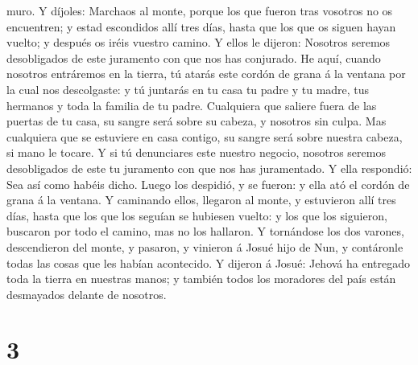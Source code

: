 muro.  Y díjoles: Marchaos al monte, porque los que
fueron tras vosotros no os encuentren; y estad escondidos allí tres
días, hasta que los que os siguen hayan vuelto; y después os iréis
vuestro camino.  Y ellos le dijeron: Nosotros seremos
desobligados de este juramento con que nos has conjurado.
 He aquí, cuando nosotros entráremos en la tierra, tú
atarás este cordón de grana á la ventana por la cual nos descolgaste: y
tú juntarás en tu casa tu padre y tu madre, tus hermanos y toda la
familia de tu padre.  Cualquiera que saliere fuera de las
puertas de tu casa, su sangre será sobre su cabeza, y nosotros sin
culpa. Mas cualquiera que se estuviere en casa contigo, su sangre será
sobre nuestra cabeza, si mano le tocare.  Y si tú
denunciares este nuestro negocio, nosotros seremos desobligados de este
tu juramento con que nos has juramentado.  Y ella
respondió: Sea así como habéis dicho. Luego los despidió, y se fueron: y
ella ató el cordón de grana á la ventana.  Y caminando
ellos, llegaron al monte, y estuvieron allí tres días, hasta que los que
los seguían se hubiesen vuelto: y los que los siguieron, buscaron por
todo el camino, mas no los hallaron.  Y tornándose los
dos varones, descendieron del monte, y pasaron, y vinieron á Josué hijo
de Nun, y contáronle todas las cosas que les habían acontecido.
 Y dijeron á Josué: Jehová ha entregado toda la tierra en
nuestras manos; y también todos los moradores del país están desmayados
delante de nosotros.

\hypertarget{section-2}{%
\section{3}\label{section-2}}


